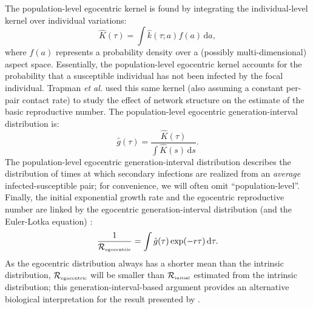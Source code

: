 \documentclass[12pt]{article}
\newcommand{\Rx}[1]{\ensuremath{{\mathcal R}_{#1}}\xspace}
\newcommand{\RR}{\ensuremath{{\mathcal R}}}
\newcommand{\Rini}{\Rx{\textrm{\tiny initial}}}
\newcommand{\Rego}{\Rx{\textrm{\tiny egocentric}}}
\newcommand{\Rhat}{\ensuremath{{\hat\RR}}}
\begin{document}
The population-level egocentric kernel is found by integrating the individual-level kernel over individual variations:
\begin{equation}\label{eq:ego}
\hat{K}(\tau) = \int \hat{k}(\tau; a) f(a) \,\mathrm{d}a,
\end{equation}
where $f(a)$ represents a probability density over a (possibly multi-dimensional) aspect space.
Essentially, the population-level egocentric kernel accounts for the probability that a susceptible individual has not been infected by the focal individual.
Trapman \textit{et al.} \cite{trapman2016inferring} used this same kernel (also assuming a constant per-pair contact rate) to study the effect of network structure on the estimate of the basic reproductive number.
The population-level egocentric generation-interval distribution is:
\begin{equation}
\hat{g}(\tau) = \frac{\hat{K}(\tau)}{\int \hat{K}(s)\,\mathrm{d}s}.
\label{eq:conditional}
\end{equation}
The population-level egocentric generation-interval distribution describes the distribution of times at which secondary infections are realized from an \emph{average} infected-susceptible pair; for convenience, we will often omit ``population-level''.
Finally, the initial exponential growth rate and the egocentric reproductive number are linked by the egocentric generation-interval distribution (and the Euler-Lotka equation) \citep{trapman2016inferring}:
\begin{equation}
\frac{1}{\Rego} = \int \hat{g}(\tau) \exp(-r \tau)\,\mathrm{d}\tau.
\label{eq:egorR}
\end{equation}
As the egocentric distribution always has a shorter mean than the intrinsic distribution, $\Rego$ will be smaller than $\Rini$ estimated from the intrinsic distribution;
this generation-interval-based argument provides an alternative biological interpretation for the result presented by \cite{trapman2016inferring}.
\end{document}

